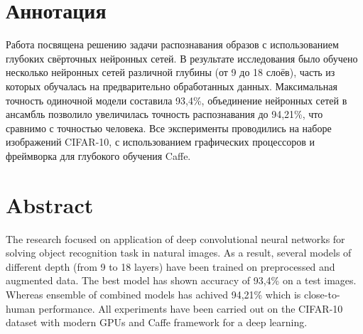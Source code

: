 \section*{Аннотация}
Работа посвящена решению задачи распознавания образов с использованием глубоких свёрточных 
нейронных сетей. В результате исследования было обучено несколько нейронных сетей различной глубины 
(от 9 до 18 слоёв), часть из которых обучалась на предварительно обработанных данных. Максимальная 
точность одиночной модели составила 93,4\%, объединение нейронных сетей в ансамбль позволило
увеличилась точность распознавания до 94,21\%, что сравнимо с точностью человека. Все эксперименты 
проводились на наборе изображений CIFAR-10, с использованием графических процессоров и фреймворка
для глубокого обучения Caffe.

\section*{Abstract}
The research focused on application of deep convolutional neural networks for
solving object recognition task in natural images. As a result, several models of different depth
(from 9 to 18 layers) have been trained on preprocessed and augmented data. The best model has shown accuracy 
of 93,4\% on a test images. Whereas ensemble of combined models has achived 94,21\% which is 
close-to-human performance. All experiments have been carried out on the CIFAR-10 dataset with modern GPUs
and Caffe framework for a deep learning.